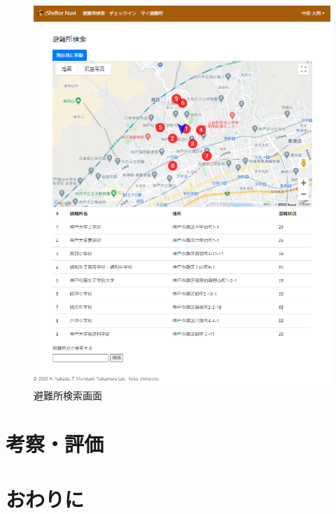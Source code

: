 \documentclass[technicalreport,dvipdfmx]{ieicej}
\begin{document}
\begin{figure}[htbp]
     \begin{center}
          \includegraphics[scale=0.6,pagebox=cropbox,clip]{search_shelter.png}
          \caption{避難所検索画面}
          \label{fig:search_shelter}
     \end{center}
\end{figure}

\section{考察・評価}

\section{おわりに}


%
%
\begin{thebibliography}{99}%
\bibitem{}
\end{thebibliography}
\end{document}
